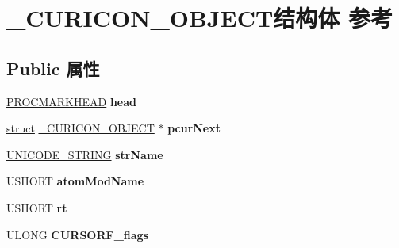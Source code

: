 \hypertarget{struct___c_u_r_i_c_o_n___o_b_j_e_c_t}{}\section{\+\_\+\+C\+U\+R\+I\+C\+O\+N\+\_\+\+O\+B\+J\+E\+C\+T结构体 参考}
\label{struct___c_u_r_i_c_o_n___o_b_j_e_c_t}
\subsection*{Public 属性}
\begin{DoxyCompactItemize}
\item 
\mbox{\label{struct___c_u_r_i_c_o_n___o_b_j_e_c_t_ae42b99365e7e490453133a3b747e7e92}} 
\hyperlink{struct___p_r_o_c_m_a_r_k_h_e_a_d}{P\+R\+O\+C\+M\+A\+R\+K\+H\+E\+AD} {\bfseries head}
\item 
\mbox{\label{struct___c_u_r_i_c_o_n___o_b_j_e_c_t_a3b4bf9cae86d83399a9cac41ca612369}} 
\hyperlink{interfacestruct}{struct} \hyperlink{struct___c_u_r_i_c_o_n___o_b_j_e_c_t}{\+\_\+\+C\+U\+R\+I\+C\+O\+N\+\_\+\+O\+B\+J\+E\+CT} $\ast$ {\bfseries pcur\+Next}
\item 
\mbox{\label{struct___c_u_r_i_c_o_n___o_b_j_e_c_t_a89fa4b7d9de456a62fe5945e004e28cb}} 
\hyperlink{struct___u_n_i_c_o_d_e___s_t_r_i_n_g}{U\+N\+I\+C\+O\+D\+E\+\_\+\+S\+T\+R\+I\+NG} {\bfseries str\+Name}
\item 
\mbox{\label{struct___c_u_r_i_c_o_n___o_b_j_e_c_t_ac2aec0dd3e329c62341f555dcbecda03}} 
U\+S\+H\+O\+RT {\bfseries atom\+Mod\+Name}
\item 
\mbox{\label{struct___c_u_r_i_c_o_n___o_b_j_e_c_t_afb66dcb2326a1c94c3208943e616792e}} 
U\+S\+H\+O\+RT {\bfseries rt}
\item 
\mbox{\label{struct___c_u_r_i_c_o_n___o_b_j_e_c_t_af0947529b83e720b117256556eceede8}} 
U\+L\+O\+NG {\bfseries C\+U\+R\+S\+O\+R\+F\+\_\+flags}
\item 
\mbox{\label{struct___c_u_r_i_c_o_n___o_b_j_e_c_t_add09744066c03dedea6d48f9fed0d041}} 

\end{DoxyCompactItemize}
